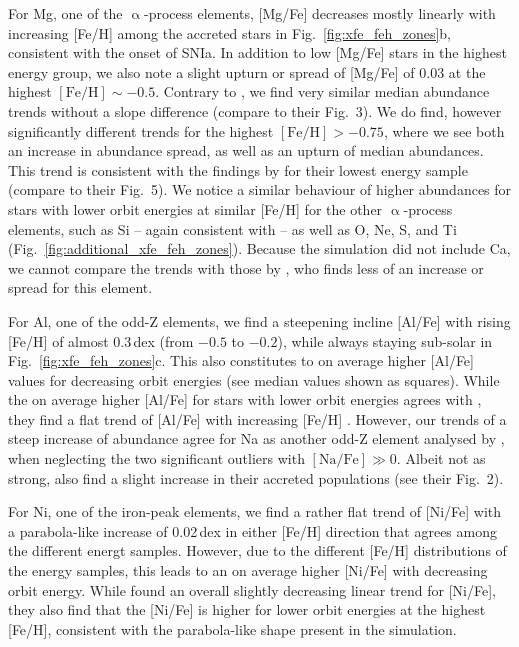 \documentclass[fleqn,usenatbib]{mnras}
\begin{document}
For Mg, one of the $\upalpha$-process elements, [Mg/Fe] decreases mostly linearly with increasing [Fe/H] among the accreted stars in Fig.~\ref{fig:xfe_feh_zones}b, consistent with the onset of SNIa. In addition to low [Mg/Fe] stars in the highest energy group, we also note a slight upturn or spread of [Mg/Fe] of 0.03 at the highest $\mathrm{[Fe/H]} \sim -0.5$. Contrary to \citet{Skuladottir2025}, we find very similar median abundance trends without a slope difference (compare to their Fig.~3). We do find, however significantly different trends for the highest $\mathrm{[Fe/H]} > -0.75$, where we see both an increase in abundance spread, as well as an upturn of median abundances. This trend is consistent with the findings by \citet{Skuladottir2025} for their lowest energy sample (compare to their Fig.~5). We notice a similar behaviour of higher abundances for stars with lower orbit energies at similar [Fe/H] for the other $\upalpha$-process elements, such as Si -- again consistent with \citet{Skuladottir2025} -- as well as O, Ne, S, and Ti (Fig.~\ref{fig:additional_xfe_feh_zones}). Because the simulation did not include Ca, we cannot compare the trends with those by \citet{Skuladottir2025}, who finds less of an increase or spread for this element.

For Al, one of the odd-Z elements, we find a steepening incline [Al/Fe] with rising [Fe/H] of almost 0.3\,dex (from $-0.5$ to $-0.2$), while always staying sub-solar in Fig.~\ref{fig:xfe_feh_zones}c. This also constitutes to on average higher [Al/Fe] values for decreasing orbit energies (see median values shown as squares). While the on average higher [Al/Fe] for stars with lower orbit energies agrees with \citet{Skuladottir2025}, they find a flat trend of [Al/Fe] with increasing [Fe/H] \citep[see also][]{Feuillet2021, Ernandes2025}. However, our trends of a steep increase of abundance agree for Na as another odd-Z element analysed by \citet[][see their Fig.~6]{Skuladottir2025}, when neglecting the two significant outliers with $\mathrm{[Na/Fe]} \gg 0$. Albeit not as strong, \citet{Belokurov2022} also find a slight increase in their accreted populations (see their Fig.~2).

For Ni, one of the iron-peak elements, we find a rather flat trend of [Ni/Fe] with a parabola-like increase of 0.02\,dex in either [Fe/H] direction that agrees among the different energt samples. However, due to the different [Fe/H] distributions of the energy samples, this leads to an on average higher [Ni/Fe] with decreasing orbit energy. While \citet{Skuladottir2025} found an overall slightly decreasing linear trend for [Ni/Fe], they also find that the [Ni/Fe] is higher for lower orbit energies at the highest [Fe/H], consistent with the parabola-like shape present in the simulation.
\end{document}
